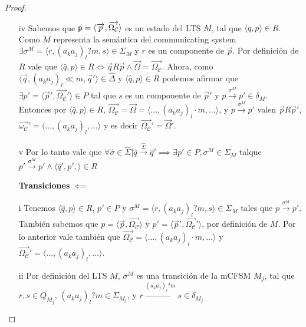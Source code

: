 \begin{prop}
\begin{proof}
\begin{itemize}
    \item[iv] Sabemos que $\mathsf{p}= \langle \overrightarrow{p}, \overrightarrow{\Omega_{\mathcal{C}}} \rangle$ es un estado del LTS $M$, tal que $\langle \hat{q},p \rangle \in R$. Como $M$ representa la semántica del communicating system $\exists \sigma^M = \langle r,(a_ka_j)_l?m,s \rangle \in \Sigma_M$ y $r$ es un componente de $\overrightarrow{p}$. Por definición de $R$ vale que $\langle \hat{q},p \rangle \in R \iff \overrightarrow{q}R\overrightarrow{p} \land \overrightarrow{\Omega} = \overrightarrow{\Omega_{\mathcal{C}}}$. Ahora, como $\langle \overrightarrow{q},(a_ka_j)_l \ll m, \overrightarrow{q}' \rangle \in \hat{\Delta}$ y $\langle \hat{q}, p \rangle \in R$ podemos afirmar que $\exists p'= \langle \overrightarrow{p}', \overrightarrow{\Omega_{\mathcal{C}}}' \rangle \in P$ tal que $s$ es un componente de $\overrightarrow{p}'$ y $p \xrightarrow{\sigma^M} p' \in \delta_M$. Entonces por $\langle \hat{q}, p \rangle \in R$, $\overrightarrow{\Omega_{\mathcal{C}}} = \overrightarrow{\Omega} = \langle \ldots,(a_ka_j)_l \cdot m, \ldots \rangle$, y $p \xrightarrow{\sigma^M} p'$ valen $\overrightarrow{p}R\overrightarrow{p}'$, $\overrightarrow{\omega_{\mathcal{C}}}' = \langle \ldots,(a_ka_j)_l, \ldots \rangle$ y es decir $\overrightarrow{\Omega_{\mathcal{C}}}' = \overrightarrow{\Omega}'$. 
    
    \item[v] Por lo tanto vale que $\forall \hat{\sigma} \in \hat{\Sigma} | \hat{q} \xrightarrow{\hat{\Sigma}} \hat{q}' \implies \exists p' \in P, \sigma^M \in \Sigma_M$ talque $p' \xrightarrow{\sigma^M} p' \land \langle \hat{q}', p', \rangle \in R$
    
    \item[\textbf{Transiciones} $\impliedby$]
    
    \item[i] Tenemos $\langle \hat{q}, p \rangle \in R$, $p' \in P$ y $\sigma^M=\langle r,(a_ka_j)_l?m,s \rangle \in \Sigma_M$ tales que $p \xrightarrow{\sigma^M} p'$. También sabemos que $p = \langle \overrightarrow{p}, \overrightarrow{\Omega_{\mathcal{C}}} \rangle$ y $p' = \langle \overrightarrow{p}', \overrightarrow{\Omega_{\mathcal{C}}}' \rangle$, por definición de $M$. Por lo anterior vale también que $\overrightarrow{\Omega_{\mathcal{C}}}= \langle \ldots,(a_ka_j)_l \cdot m, \ldots \rangle$ y $\overrightarrow{\Omega_{\mathcal{C}}}'= \langle \ldots,(a_ka_j)_l, \ldots \rangle$.
    
    \item[ii] Por definición del LTS $M$, $\sigma^M$ es una transición de la mCFSM $M_j$, tal que $r,s \in Q_{M_j}$, $(a_ka_j)_l?m \in \Sigma_{M_j}$, y $r \xrightarrow{(a_ka_j)_l?m} s \in \delta_{M_j}$
    

\end{itemize}
\end{proof}
\end{prop}

